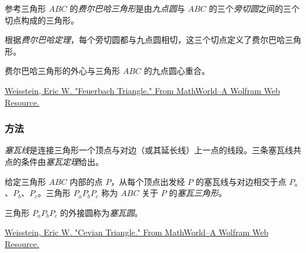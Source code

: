 参考三角形 $ABC$ 的\emph{费尔巴哈三角形}是由\emph{九点圆}与 $ABC$ 的三个\emph{旁切圆}之间的三个切点构成的三角形。

根据\emph{费尔巴哈定理}，每个旁切圆都与九点圆相切，这三个切点定义了费尔巴哈三角形。

费尔巴哈三角形的外心与三角形 $ABC$ 的九点圆心重合。
\begin{flushright}
  \small
\href{[URL1]}{Weisstein, Eric W. "Feuerbach Triangle." From MathWorld--A Wolfram Web Resource.}
\end{flushright}

\vspace{1em}

\begin{tkzexample}[latex=.5\textwidth]
\end{tkzexample}

\subsubsection{方法 }
\label{ssub:method_triangle_cevian}

\emph{塞瓦线}是连接三角形一个顶点与对边（或其延长线）上一点的线段。三条塞瓦线共点的条件由\emph{塞瓦定理}给出。

给定三角形 $ABC$ 内部的点 $P$，从每个顶点出发经 $P$ 的塞瓦线与对边相交于点 $P_a$、$P_b$、$P_c$。三角形 $P_aP_bP_c$ 称为 $ABC$ 关于 $P$ 的\emph{塞瓦三角形}。

三角形 $P_aP_bP_c$ 的外接圆称为\emph{塞瓦圆}。
\begin{flushright}
  \small
\href{[URL1]}{Weisstein, Eric W. "Cevian Triangle." From MathWorld--A Wolfram Web Resource.}
\end{flushright}

